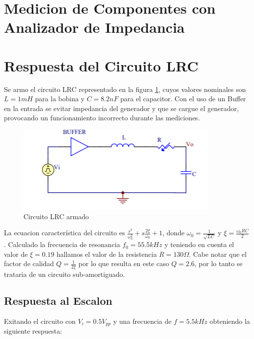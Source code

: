 



\onehalfspacing



\section{Medicion de Componentes con Analizador de Impedancia}


\section{Respuesta del Circuito LRC}

Se armo el circuito LRC representado en la figura \ref{fig:LRC1}, cuyos valores nominales son $L=1mH$ para la bobina y $C=8.2nF$ para el capacitor. Con el uso de un Buffer en la entrada se evitar impedancia del generador y que se cargue el generador, provocando un funcionamiento incorrecto durante las mediciones.

\begin{figure}[h!]
\centering
\includegraphics[scale=0.5]{lrcCircuito.png}
\caption{Circuito LRC armado}
\label{fig:LRC1}
\end{figure}

La ecuacion característica del circuito es $\frac{s^2}{\omega_0^2}+s\frac{2\xi}{\omega_0}+1$, donde $\omega_0 = \frac{1}{\sqrt{LC}}$ y $\xi = \frac{\omega_0RC}{2}$. Calculado la frecuencia de resonancia $f_0=55.5kHz$ y teniendo en cuenta el valor de $\xi = 0.19$ hallamos el valor de la resistencia $R = 130\Omega$. Cabe notar que el factor de calidad $Q = \frac{1}{2\xi}$ por lo que resulta en este caso $Q = 2.6$, por lo tanto se trataria de un circuito sub-amortiguado. 

\subsection{Respuesta al Escalon}

Exitando el circuito con $V_i = 0.5V_{pp}$ y una frecuencia de $f = 5.5kHz$ obteniendo la siguiente respuesta:

